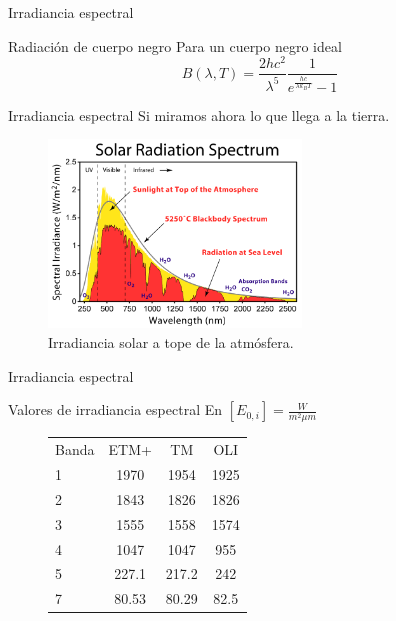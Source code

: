 \documentclass[]{beamer}
\begin{document}
\begin{frame}{Irradiancia espectral}
  \begin{block}{Radiación de cuerpo negro}
    Para un cuerpo negro ideal
    \begin{equation}
      B(\lambda,T) = \frac{2hc^2}{\lambda^5}\frac{1}{e^{\frac{hc}{\lambda k_B T}}-1}
    \end{equation}
  \end{block}
\end{frame}

\begin{frame}{Irradiancia espectral}
  Si miramos ahora lo que llega a la tierra.
  \begin{figure}
    \includegraphics[width=0.6\textwidth]{imagenes/solar_spectrum.png}
    \caption{Irradiancia solar a tope de la atmósfera.}
  \end{figure}
\end{frame}

\begin{frame}{Irradiancia espectral}
  \begin{exampleblock}{Valores de irradiancia espectral}
    En $[E_{0,i}] = \frac{W}{m^2 \mu m}$
    \begin{figure}
      \begin{tabular}{l c c c}
          Banda & ETM+  & TM    &  OLI \\
          1     & 1970  & 1954  & 1925 \\
          2     & 1843  & 1826  & 1826 \\
          3     & 1555  & 1558  & 1574 \\
          4     & 1047  & 1047  & 955  \\
          5     & 227.1 & 217.2 & 242 \\
          7     & 80.53 & 80.29 & 82.5\\
      \end{tabular}
    \end{figure}
  \end{exampleblock}
\end{frame}
\end{document}
